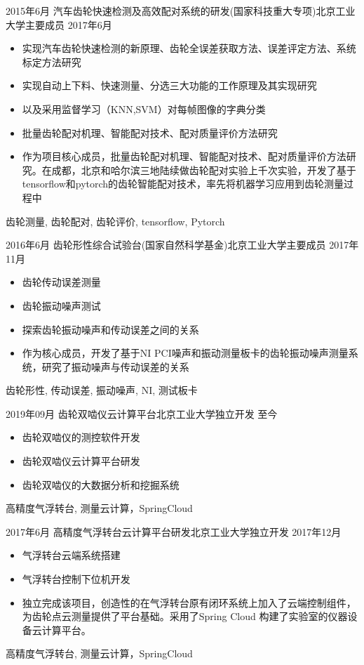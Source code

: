 \begin{experiences}
  \experience
  {2015年6月} {汽车齿轮快速检测及高效配对系统的研发(国家科技重大专项)}{北京工业大学}{主要成员}
  {2017年6月}    {
    \begin{itemize}
      \item 实现汽车齿轮快速检测的新原理、齿轮全误差获取方法、误差评定方法、系统标定方法研究
      \item 实现自动上下料、快速测量、分选三大功能的工作原理及其实现研究
      \item 以及采用监督学习（KNN,SVM）对每帧图像的字典分类
      \item 批量齿轮配对机理、智能配对技术、配对质量评价方法研究
      \item 作为项目核心成员，批量齿轮配对机理、智能配对技术、配对质量评价方法研究。在成都，北京和哈尔滨三地陆续做齿轮配对实验上千次实验，开发了基于tensorflow和pytorch的齿轮智能配对技术，率先将机器学习应用到齿轮测量过程中
    \end{itemize}
  }
  {齿轮测量, 齿轮配对, 齿轮评价, tensorflow, Pytorch}

  \emptySeparator
  \experience
  {2016年6月} {齿轮形性综合试验台(国家自然科学基金)}{北京工业大学}{主要成员}
  {2017年11月 }    {
    \begin{itemize}
      \item 齿轮传动误差测量
      \item 齿轮振动噪声测试
      \item 探索齿轮振动噪声和传动误差之间的关系
      \item 作为核心成员，开发了基于NI PCI噪声和振动测量板卡的齿轮振动噪声测量系统，研究了振动噪声与传动误差的关系
    \end{itemize}
  }
  {齿轮形性, 传动误差, 振动噪声, NI, 测试板卡}

  \emptySeparator
  \experience
  {2019年09月} {齿轮双啮仪云计算平台}{北京工业大学}{独立开发}
  {至今}    {
    \begin{itemize}
      \item 齿轮双啮仪的测控软件开发
      \item 齿轮双啮仪云计算平台研发
      \item 齿轮双啮仪的大数据分析和挖掘系统
    \end{itemize}
  }
  {高精度气浮转台, 测量云计算，SpringCloud}

  \emptySeparator
  \experience
  {2017年6月} {高精度气浮转台云计算平台研发}{北京工业大学}{独立开发}
  {2017年12月}    {
    \begin{itemize}
      \item 气浮转台云端系统搭建
      \item 气浮转台控制下位机开发
      \item 独立完成该项目，创造性的在气浮转台原有闭环系统上加入了云端控制组件，为齿轮点云测量提供了平台基础。采用了Spring Cloud 构建了实验室的仪器设备云计算平台。
    \end{itemize}
  }
  {高精度气浮转台, 测量云计算，SpringCloud}


\end{experiences}
